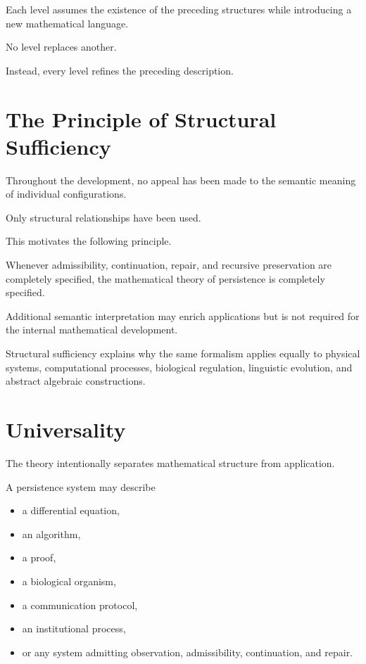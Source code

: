 \documentclass[11pt]{book}
\numberwithin{equation}{chapter}
\theoremstyle{definition}
\theoremstyle{plain}
\begin{document}
Each level assumes the existence of the preceding structures while
introducing a new mathematical language.

No level replaces another.

Instead, every level refines the preceding description.

\section{The Principle of Structural Sufficiency}

Throughout the development, no appeal has been made to the semantic
meaning of individual configurations.

Only structural relationships have been used.

This motivates the following principle.

\begin{principle}

Whenever admissibility, continuation, repair, and recursive
preservation are completely specified, the mathematical theory of
persistence is completely specified.

Additional semantic interpretation may enrich applications but is not
required for the internal mathematical development.

\end{principle}

Structural sufficiency explains why the same formalism applies equally
to physical systems, computational processes, biological regulation,
linguistic evolution, and abstract algebraic constructions.

\section{Universality}

The theory intentionally separates mathematical structure from
application.

A persistence system may describe

\begin{itemize}

\item a differential equation,

\item an algorithm,

\item a proof,

\item a biological organism,

\item a communication protocol,

\item an institutional process,

\item or any system admitting observation, admissibility,
continuation, and repair.

\end{itemize}
\end{document}
